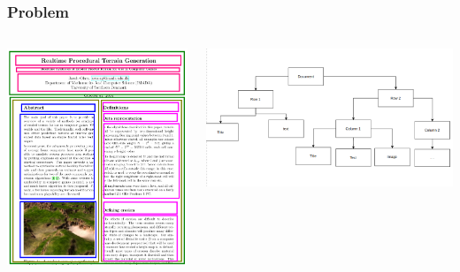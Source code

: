 \documentclass{beamer}
\begin{document}
\begin{frame}
	\frametitle{Problem}
	\begin{columns}
		\begin{column}{0.5\textwidth}
			\includegraphics[width=\textwidth]{./png/segmented-doc.png}
		\end{column}
		\begin{column}{0.5\textwidth}
			\includegraphics[width=\textwidth]{./png/tree.png}
		\end{column}
	\end{columns}
\end{frame}
\end{document}
